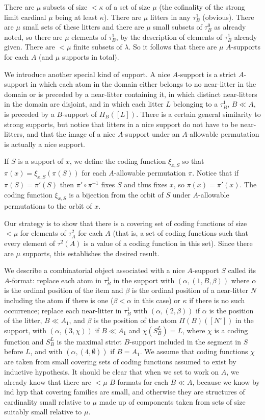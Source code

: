 \documentclass[12pt]{article}
\begin{document}
There are $\mu$ subsets of size $<\kappa$ of a set of size $\mu$ (the cofinality of the strong limit cardinal $\mu$ being at least $\kappa$).  There are $\mu$ litters
in any $\tau^1_B$ (obvious).  There are $\mu$ small sets of these litters and there are $\mu$ small subsets of $\tau^0_B$ as already noted, so there are $\mu$ elements of
$\tau^1_B$, by the description of elements of $\tau^1_B$ already given.  There are $<\mu$ finite subsets of $\lambda$.  So it follows that there are $\mu$ $A$-supports
for each $A$ (and $\mu$ supports in total).

We introduce another special kind of support.  A nice $A$-support is a strict $A$-support in which each atom in the domain either belongs to no near-litter in the domain
or is preceded by a near-litter containing it, in which distinct near-litters in the domain are disjoint, and in which each litter $L$ belonging to a $\tau^1_B$, $B \ll A$, is preceded by a $B$-support of $\Pi_B([L])$.  There is a certain general similarity to strong supports, but notice that litters in a nice support do not have to be near-litters, and that the image of a nice $A$-support under an $A$-allowable permutation is actually a nice support.

If $S$ is a support of $x$, we define the coding function $\xi_{x,S}$ so that $\pi(x) = \xi_{x,S}(\pi(S))$ for each $A$-allowable permutation $\pi$.  Notice that if $\pi(S)=\pi'(S)$ then $\pi'\circ \pi^{-1}$ fixes $S$ and thus fixes $x$, so $\pi(x) = \pi'(x)$.  The coding function $\xi_{x,S}$  is a bijection from the orbit of $S$ under $A$-allowable permutations to the orbit of $x$.

Our strategy is to show that there is a covering set of coding functions of size $<\mu$ for elements of $\tau^2_A$  for each $A$ (that is, a set of coding functions
such that every element of $\tau^2(A)$ is a value of a coding function in this set).  Since there are $\mu$ supports, this establishes the desired result.

We describe a combinatorial object associated with a nice $A$-support $S$ called its $A$-format:  replace each atom in $\tau^1_B$ in the support with $(\alpha,(1,B,\beta))$ where
$\alpha$ is the ordinal position of the item and $\beta$ is the ordinal position of a near-litter $N$ including the atom if there is one ($\beta <\alpha$ in this case) or $\kappa$ if
there is no such occurrence;  replace each near-litter in $\tau^1_B$ with $(\alpha,(2,\beta))$ if $\alpha$ is the position of the litter, $B \ll A_1$, and $\beta$ is the position of the
atom $\Pi(B)([N^{\circ}])$ in the support, with $(\alpha,(3,\chi))$ if $B\ll A_1$ and $\chi(S^L_B) = L$, where $\chi$ is a coding function and $S^L_B$ is the maximal strict $B$-support
included in the segment in $S$ before $L$, and with $(\alpha,(4,\emptyset))$ if $B = A_1$.  We assume that coding functions $\chi$ are taken from small covering sets of coding
functions assumed to exist by inductive hypothesis.  It should be clear that when we set to work on $A$, we already know that there are $<\mu$ $B$-formats for each $B \ll A$, because we know by ind hyp that covering families are small, and otherwise they are structures of cardinality small relative to $\mu$ made up of components taken from sets of size suitably small relative to $\mu$.
\end{document}
